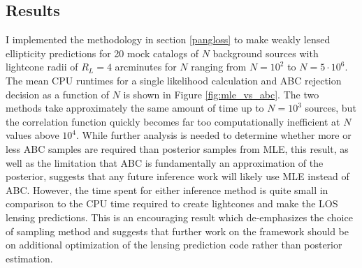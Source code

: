 \documentclass[%
 reprint,
 amsmath,amssymb,
 aps,nofootinbib
]{revtex4-1}
\begin{document}
\subsection{Results} \label{inference_results}

I implemented the methodology in section \ref{pangloss} to make weakly lensed ellipticity predictions for 20 mock catalogs of $N$ background sources with lightcone radii of $R_L=4$ arcminutes for $N$ ranging from $N=10^2$ to $N=5\cdot10^6$. The mean CPU runtimes for a single likelihood calculation and ABC rejection decision as a function of $N$ is shown in Figure \ref{fig:mle_vs_abc}. The two methods take approximately the same amount of time up to $N=10^3$ sources, but the correlation function quickly becomes far too computationally inefficient at $N$ values above $10^4$. While further analysis is needed to determine whether more or less ABC samples are required than posterior samples from MLE, this result, as well as the limitation that ABC is fundamentally an approximation of the posterior, suggests that any future inference work will likely use MLE instead of ABC. However, the time spent for either inference method is quite small in comparison to the CPU time required to create lightcones and make the LOS lensing predictions. This is an encouraging result which de-emphasizes the choice of sampling method and suggests that further work on the framework should be on additional optimization of the lensing prediction code rather than posterior estimation.
\end{document}
